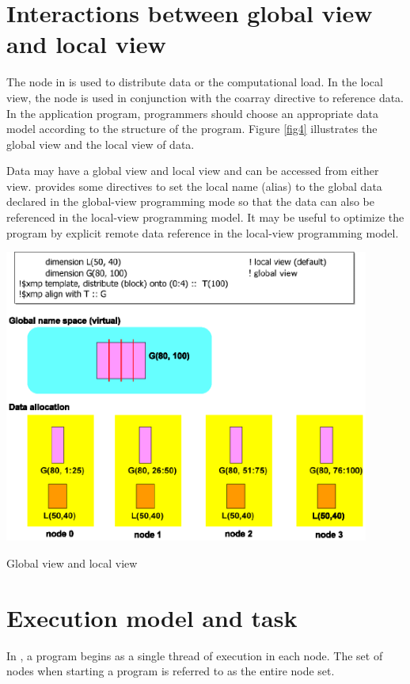 \section{Interactions between global view and local view}

The node in
\XMP is used to distribute data or the computational
load. In the local view, the node is used in conjunction with the coarray
directive to reference data. In the application program, programmers
should choose an appropriate data model according to the structure of
the program. Figure \ref{fig4} illustrates the global view and the local view of data.

Data may have a global view and local view and can be
accessed from either view. \XMP provides some
directives to set the local name (alias) to the global data declared in
the global-view programming mode so that the data can also be referenced 
in the local-view programming model. It may be useful to optimize the
program by explicit remote data reference in the local-view programming model.


\begin{myfigure}
\includegraphics[width=12cm]{figs/Fig4.eps}
  \caption{Global view and local view}
\label{fig4}
\end{myfigure}

\section{Execution model and task}


In \XMP, a program begins as a single thread
of execution in each node. The set of nodes when starting a program is
referred to as the entire node set.

